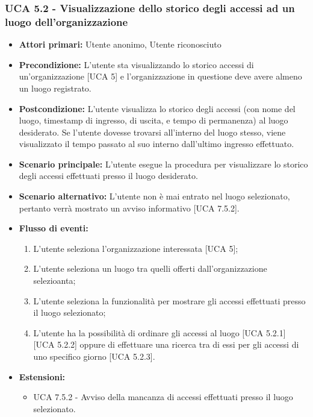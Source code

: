 \subsubsection{UCA 5.2 - Visualizzazione dello storico degli accessi ad un luogo dell'organizzazione}
\begin{itemize}
    \item \textbf{Attori primari:} Utente anonimo, Utente riconosciuto
    \item \textbf{Precondizione:} L'utente sta visualizzando lo storico accessi di un'organizzazione [UCA 5] e l'organizzazione in questione deve avere almeno un luogo registrato.
    \item \textbf{Postcondizione:} L'utente visualizza lo storico degli accessi (con nome del luogo, timestamp di ingresso, di uscita, e tempo di permanenza) al luogo desiderato. Se l'utente dovesse trovarsi all'interno del luogo stesso, viene visualizzato il tempo passato al suo interno dall'ultimo ingresso effettuato.
    \item \textbf{Scenario principale:} L'utente esegue la procedura per visualizzare lo storico degli accessi effettuati presso il luogo desiderato.
    \item \textbf{Scenario alternativo:} L'utente non è mai entrato nel luogo selezionato, pertanto verrà mostrato un avviso informativo [UCA 7.5.2].
    \item \textbf{Flusso di eventi:}
    \begin{enumerate}
        \item L'utente seleziona l'organizzazione interessata [UCA 5];
        \item L'utente seleziona un luogo tra quelli offerti dall'organizzazione selezioanta;
        \item L'utente seleziona la funzionalità per mostrare gli accessi effettuati presso il luogo selezionato;
        \item L'utente ha la possibilità di ordinare gli accessi al luogo [UCA 5.2.1] [UCA 5.2.2] oppure di effettuare una ricerca tra di essi per gli accessi di uno specifico giorno [UCA 5.2.3].
    \end{enumerate}
    \item \textbf{Estensioni:}
    \begin{itemize}
        \item UCA 7.5.2 - Avviso della mancanza di accessi effettuati presso il luogo selezionato.
    \end{itemize}
\end{itemize}

